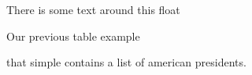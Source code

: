 There is some text around this float
\begin{table}
	
	\caption{Our previous table example}
\end{table}
that simple contains a list of american presidents.
